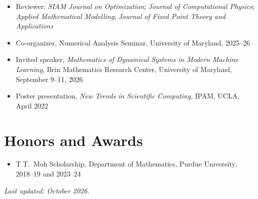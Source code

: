 \documentclass[11pt]{article}
\begin{document}
\begin{itemize}[leftmargin=1.5em, label={$\bullet$}, itemsep=3pt]
\item Reviewer: \textit{SIAM Journal on Optimization}; \textit{Journal of Computational Physics}; \textit{Applied Mathematical Modelling}; \textit{Journal of Fixed Point Theory and Applications}
\item Co-organizer, Numerical Analysis Seminar, University of Maryland, 2025--26
\item Invited speaker, \textit{Mathematics of Dynamical Systems in Modern Machine Learning}, Brin Mathematics Research Center, University of Maryland, September 9--11, 2026
\item Poster presentation, \textit{New Trends in Scientific Computing}, IPAM, UCLA, April 2022
\end{itemize}

\section{Honors and Awards}

\begin{itemize}[leftmargin=1.5em, label={$\bullet$}, itemsep=3pt]
\item T.T.~Moh Scholarship, Department of Mathematics, Purdue University, 2018--19 and 2023--24
\end{itemize}

\vfill
{\small\itshape Last updated: October 2026.}
\end{document}
